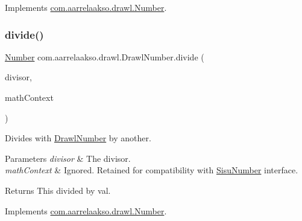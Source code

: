 Implements \hyperlink{interfacecom_1_1aarrelaakso_1_1drawl_1_1_number_afb73cae0a12c1d25e450be6270eecfb1}{com.\+aarrelaakso.\+drawl.\+Number}.

\mbox{\label{classcom_1_1aarrelaakso_1_1drawl_1_1_drawl_number_ad6350a9965757a1ffeb859d71ee0219e}} 
\subsubsection{\texorpdfstring{divide()}{divide()}\hspace{0.1cm}{\footnotesize\ttfamily [1/3]}}
{\footnotesize\ttfamily \hyperlink{interfacecom_1_1aarrelaakso_1_1drawl_1_1_number}{Number} com.\+aarrelaakso.\+drawl.\+Drawl\+Number.\+divide (\begin{DoxyParamCaption}\item[{@Not\+Null final \hyperlink{interfacecom_1_1aarrelaakso_1_1drawl_1_1_number}{Number}}]{divisor,  }\item[{final Math\+Context}]{math\+Context }\end{DoxyParamCaption})}



Divides with \hyperlink{classcom_1_1aarrelaakso_1_1drawl_1_1_drawl_number}{Drawl\+Number} by another. 


\begin{DoxyParams}{Parameters}
{\em divisor} & The divisor. \\
\hline
{\em math\+Context} & Ignored. Retained for compatibility with \hyperlink{classcom_1_1aarrelaakso_1_1drawl_1_1_sisu_number}{Sisu\+Number} interface. \\
\hline
\end{DoxyParams}
\begin{DoxyReturn}{Returns}
This divided by val. 
\end{DoxyReturn}


Implements \hyperlink{interfacecom_1_1aarrelaakso_1_1drawl_1_1_number_adfd6e1a6e96cbface21eef9b2d8860d0}{com.\+aarrelaakso.\+drawl.\+Number}.

\mbox{\label{classcom_1_1aarrelaakso_1_1drawl_1_1_drawl_number_a24ee9901f4d84a2fc086d4e727bf40c7}} 
